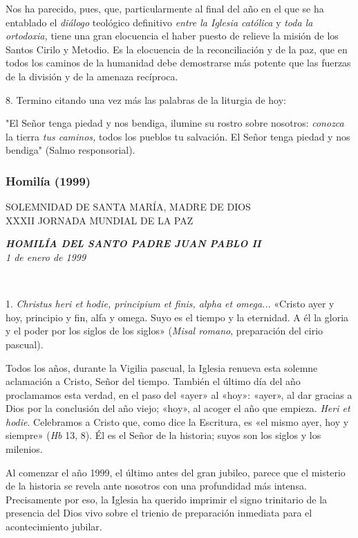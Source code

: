 Nos ha parecido, pues, que, particularmente al final del año en el que
se ha entablado el \emph{diálogo} teológico definitivo \emph{entre la
	Iglesia católica} y \emph{toda la ortodoxia,} tiene una gran elocuencia
el haber puesto de relieve la misión de los Santos Cirilo y Metodio. Es
la elocuencia de la reconciliación y de la paz, que en todos los caminos
de la humanidad debe demostrarse más potente que las fuerzas de la
división y de la amenaza recíproca.

8. Termino citando una vez más las palabras de la liturgia de hoy:

"El Señor tenga piedad y nos bendiga, ilumine su rostro sobre nosotros:
\emph{conozca} la tierra \emph{tus caminos,} todos los pueblos tu
salvación. El Señor tenga piedad y nos bendiga" (Salmo responsorial).

\subsubsection{Homilía (1999)}
SOLEMNIDAD DE SANTA MARÍA, MADRE DE DIOS\\
XXXII JORNADA MUNDIAL DE LA PAZ

\emph{\textbf{HOMILÍA DEL SANTO PADRE JUAN PABLO
		II}}\\[2\baselineskip]\emph{1 de enero de 1999}

~

1. \emph{Christus heri et hodie, principium et finis, alpha et omega..}.
«Cristo ayer y hoy, principio y fin, alfa y omega. Suyo es el tiempo y
la eternidad. A él la gloria y el poder por los siglos de los siglos»
(\emph{Misal romano}, preparación del cirio pascual).

Todos los años, durante la Vigilia pascual, la Iglesia renueva esta
solemne aclamación a Cristo, Señor del tiempo. También el último día del
año proclamamos esta verdad, en el paso del «ayer» al «hoy»: «ayer», al
dar gracias a Dios por la conclusión del año viejo; «hoy», al acoger el
año que empieza. \emph{Heri et hodie}. Celebramos a Cristo que, como
dice la Escritura, es «el mismo ayer, hoy y siempre» (\emph{Hb} 13, 8).
Él es el Señor de la historia; suyos son los siglos y los milenios.

Al comenzar el año 1999, el último antes del gran jubileo, parece que el
misterio de la historia se revela ante nosotros con una profundidad más
intensa. Precisamente por eso, la Iglesia ha querido imprimir el signo
trinitario de la presencia del Dios vivo sobre el trienio de preparación
inmediata para el acontecimiento jubilar.

